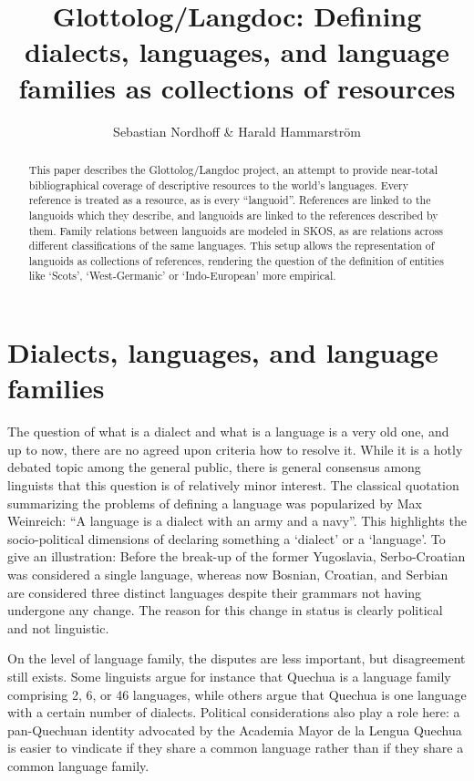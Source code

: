 \documentclass{llncs}
\title{Glottolog/Langdoc: Defining dialects, languages, and language families as  collections of resources}
\author{Sebastian Nordhoff \& Harald Hammarstr\"om}
\institute{Max Planck Institute for Evolutionary Anthropology}
\begin{document}
\maketitle

\begin{abstract} 
This paper describes the Glottolog/Langdoc project, an attempt to provide near-total bibliographical coverage of descriptive resources to the world's languages. Every reference is treated as a resource, as  is every ``languoid''\citep{ling:GoodHendryx:Categorization}. References are linked to the languoids which they describe, and languoids are linked to the references described by them. Family relations between languoids are modeled in SKOS, as are relations across different classifications of the same languages. This setup allows the representation of languoids as collections of references, rendering the question of the definition of entities like `Scots', `West-Germanic' or `Indo-European' more empirical.
\end{abstract}

\section{Dialects, languages, and language families}
The question of what is a dialect and what is a language is a very old one, and up to now, there are no agreed upon criteria how to resolve it. While it is a hotly debated topic among the general public, there is general consensus among linguists that this question is of relatively minor interest. The classical quotation summarizing the problems of defining a language was popularized by Max Weinreich:  ``A language is a dialect with an army and a navy''. This highlights the socio-political dimensions of declaring something a `dialect' or a `language'. To give an illustration: Before the break-up of the former Yugoslavia, Serbo-Croatian was considered a single language, whereas now Bosnian, Croatian, and Serbian are considered three distinct languages despite their grammars not having undergone any change. The reason for this change in status is clearly political and not linguistic.

On the level of language family, the disputes are less important, but disagreement still exists. Some linguists argue for instance that Quechua is a language family comprising 2, 6, or 46  languages, while others argue that Quechua is one language with a certain number of dialects. Political considerations also play a role here: a pan-Quechuan identity advocated by the Academia Mayor de la Lengua Quechua  is easier to vindicate if they share a common language rather than if they share a common language family.
\end{document}
